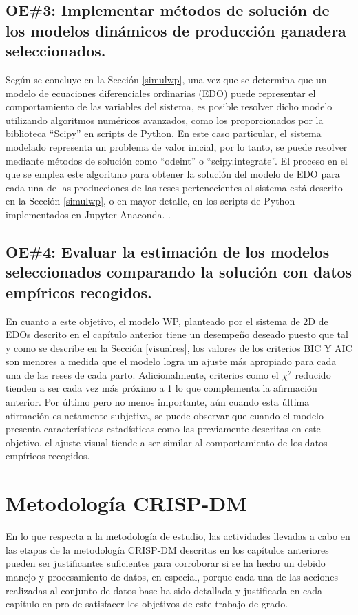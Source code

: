 \subsection{OE\#3: Implementar métodos de solución de los modelos dinámicos de producción ganadera seleccionados.}

Según se concluye en la Sección \ref{simulwp}, una vez que se determina que un modelo de ecuaciones diferenciales ordinarias (EDO) puede representar el comportamiento de las variables del sistema, es posible resolver dicho modelo utilizando algoritmos numéricos avanzados, como los proporcionados por la biblioteca ``Scipy'' en scripts de Python. En este caso particular, el sistema modelado representa un problema de valor inicial, por lo tanto, se puede resolver mediante métodos de solución como ``odeint'' o ``scipy.integrate''. El proceso en el que se emplea este algoritmo para obtener la solución del modelo de EDO para cada una de las producciones de las reses pertenecientes al sistema está descrito en la Sección \ref{simulwp}, o en mayor detalle, en los scripts de Python implementados en Jupyter-Anaconda. \cite{msclfggprogrepo}.


\subsection{OE\#4: Evaluar la estimación de los modelos seleccionados comparando la solución con datos empíricos recogidos.}

En cuanto a este objetivo, el modelo WP, planteado por el sistema de 2D de EDOs descrito en el capítulo anterior tiene un desempeño deseado puesto que tal y como se describe en la Sección \ref{visualres}, los valores de los criterios BIC Y AIC son menores a medida que el modelo logra un ajuste más apropiado para cada una de las reses de cada parto. Adicionalmente, criterios como el $\chi^{2}$ reducido tienden a ser cada vez más próximo a 1 lo que complementa la afirmación anterior. Por último pero no menos importante, aún cuando esta última afirmación es netamente subjetiva, se puede observar que  cuando el modelo presenta características estadísticas como las previamente descritas en este objetivo, el ajuste visual tiende a ser similar al comportamiento de los datos empíricos recogidos.

\section{Metodología CRISP-DM}

En lo que respecta a la metodología de estudio, las actividades llevadas a cabo en las etapas de la metodología CRISP-DM descritas en los capítulos anteriores pueden ser justificantes suficientes para corroborar si se ha hecho un debido manejo y procesamiento de datos, en especial, porque cada una de las acciones realizadas al conjunto de datos base ha sido detallada y justificada en cada capítulo en pro de satisfacer los objetivos de este trabajo de grado.

